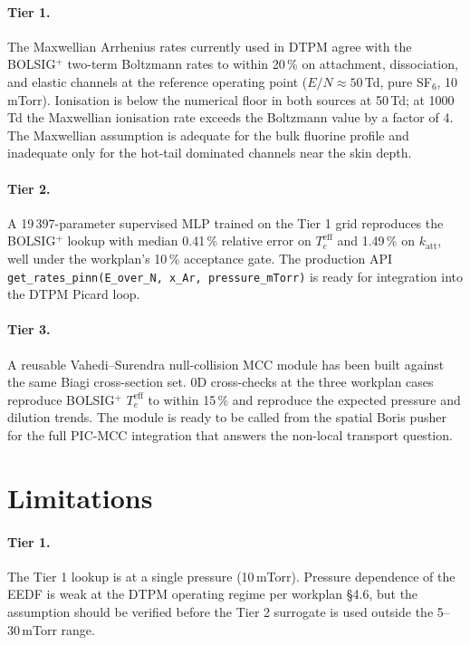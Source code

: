 \documentclass[11pt,a4paper]{article}
\newcommand{\katt}{k_{\mathrm{att}}}
\begin{document}
\paragraph{Tier 1.} The Maxwellian Arrhenius rates currently
used in DTPM agree with the BOLSIG$^+$ two-term Boltzmann
rates to within 20\,\% on attachment, dissociation, and elastic
channels at the reference operating point ($E/N \approx
50$\,Td, pure SF$_6$, 10\,mTorr). Ionisation is below the
numerical floor in both sources at 50\,Td; at 1000\,Td the
Maxwellian ionisation rate exceeds the Boltzmann value by a
factor of 4. The Maxwellian assumption is adequate for the
bulk fluorine profile and inadequate only for the hot-tail
dominated channels near the skin depth.

\paragraph{Tier 2.} A 19\,397-parameter supervised MLP trained
on the Tier 1 grid reproduces the BOLSIG$^+$ lookup with
median 0.41\,\% relative error on $T_e^{\mathrm{eff}}$ and
1.49\,\% on $\katt$, well under the workplan's 10\,\%
acceptance gate. The production API
\texttt{get\_rates\_pinn(E\_over\_N, x\_Ar, pressure\_mTorr)}
is ready for integration into the DTPM Picard loop.

\paragraph{Tier 3.} A reusable Vahedi--Surendra null-collision
MCC module has been built against the same Biagi cross-section
set. 0D cross-checks at the three workplan cases reproduce
BOLSIG$^+$ $T_e^{\mathrm{eff}}$ to within 15\,\% and reproduce
the expected pressure and dilution trends. The module is
ready to be called from the spatial Boris pusher for the full
PIC-MCC integration that answers the non-local transport
question.

\section{Limitations}
\label{sec:limitations}

\paragraph{Tier 1.} The Tier 1 lookup is at a single pressure
(10\,mTorr). Pressure dependence of the EEDF is weak at the
DTPM operating regime per workplan §4.6, but the assumption
should be verified before the Tier 2 surrogate is used outside
the 5--30\,mTorr range.
\end{document}

